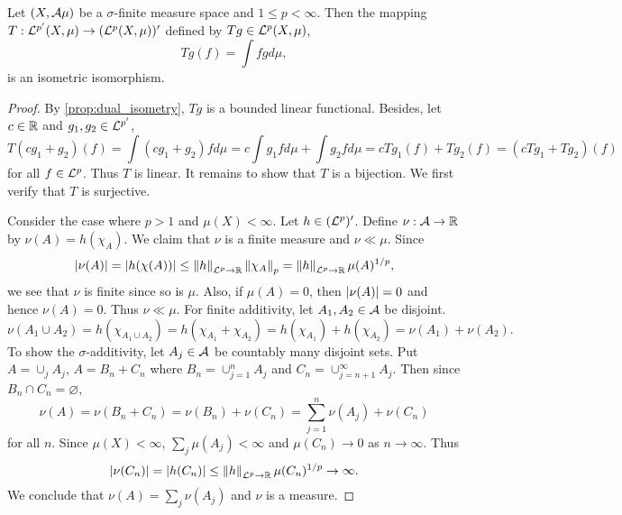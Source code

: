 \begin{theorem}
    Let $(X,\mathcal{A}\mu)$ be a $\sigma$-finite measure space and $1\leq p<\infty$. 
    Then the mapping $T:\mathcal{L}^{p'}(X,\mu)\to(\mathcal{L}^p(X,\mu))'$ defined by 
    $Tg\in\mathcal{L}^p(X,\mu)$, 
    \begin{equation*}
        Tg(f) = \int fg d\mu,
    \end{equation*}
    is an isometric isomorphism.
\end{theorem}
\begin{proof}
    By \cref{prop:dual_isometry}, $Tg$ is a bounded linear functional. 
    Besides, let $c\in\mathbb{R}$ and $g_1,g_2\in\mathcal{L}^{p'}$,
    \begin{equation*}
        T(cg_1+g_2)(f) = \int (cg_1+g_2)fd\mu = c\int g_1fd\mu + \int g_2fd\mu 
        = cTg_1(f) + Tg_2(f) = (cTg_1+Tg_2)(f)
    \end{equation*}
    for all $f\in\mathcal{L}^p$. Thus $T$ is linear. It remains to show 
    that $T$ is a bijection. We first verify that $T$ is surjective. 

    Consider the case where $p>1$ and $\mu(X)<\infty$. Let $h\in(\mathcal{L}^p)'$. 
    Define $\nu:\mathcal{A}\to\mathbb{R}$ by $\nu(A) = h(\chi_A)$. We claim that $\nu$ 
    is a finite measure and $\nu\ll\mu$. Since 
    \begin{equation*}
        \left\lvert {\nu(A)} \right\rvert = \left\lvert {h(\chi(A))} \right\rvert \leq \left\lVert {h} \right\rVert_{\mathcal{L}^p\to\mathbb{R}}\left\lVert {\chi_A} \right\rVert_p 
        = \left\lVert {h} \right\rVert_{\mathcal{L}^p\to\mathbb{R}}\mu(A)^{1/p},
    \end{equation*}
    we see that $\nu$ is finite since so is $\mu$. Also, if $\mu(A) = 0$, 
    then $\left\lvert {\nu(A)} \right\rvert = 0$ and hence $\nu(A) = 0$. Thus $\nu\ll\mu$. 
    For finite additivity, let $A_1,A_2\in\mathcal{A}$ be disjoint. 
    \begin{equation*}
        \nu(A_1\cup A_2) = h(\chi_{A_1\cup A_2}) = h(\chi_{A_1}+\chi_{A_2}) 
        = h(\chi_{A_1}) + h(\chi_{A_2}) = \nu(A_1) + \nu(A_2).
    \end{equation*}
    To show the $\sigma$-additivity, let $A_j\in\mathcal{A}$ be countably many 
    disjoint sets. Put $A = \cup_j A_j$, $A = B_n + C_n$ where 
    $B_n = \cup_{j=1}^{n} A_j$ and $C_n = \cup_{j=n+1}^{\infty} A_j$. 
    Then since $B_n\cap C_n = \varnothing$, 
    \begin{equation*}
        \nu(A) = \nu(B_n + C_n) = \nu(B_n) + \nu(C_n) 
        = \sum_{j=1}^{n}\nu(A_j) + \nu(C_n)
    \end{equation*}
    for all $n$. Since $\mu(X)<\infty$, $\sum_j \mu(A_j)<\infty$ and 
    $\mu(C_n)\to 0$ as $n\to\infty$. Thus 
    \begin{equation*}
        \left\lvert {\nu(C_n)} \right\rvert = \left\lvert {h(C_n)} \right\rvert 
        \leq \left\lVert {h} \right\rVert_{\mathcal{L}^p\to\mathbb{R}}\mu(C_n)^{1/p}\to\infty.
    \end{equation*} 
    We conclude that $\nu(A) = \sum_j \nu(A_j)$ and $\nu$ is a measure. 


\end{proof}
